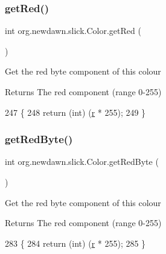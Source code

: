 \subsubsection{\texorpdfstring{get\+Red()}{getRed()}}
{\footnotesize\ttfamily int org.\+newdawn.\+slick.\+Color.\+get\+Red (\begin{DoxyParamCaption}{ }\end{DoxyParamCaption})\hspace{0.3cm}{\ttfamily [inline]}}

Get the red byte component of this colour

\begin{DoxyReturn}{Returns}
The red component (range 0-\/255) 
\end{DoxyReturn}

\begin{DoxyCode}
247                         \{
248         \textcolor{keywordflow}{return} (\textcolor{keywordtype}{int}) (\mbox{\hyperlink{classorg_1_1newdawn_1_1slick_1_1_color_ac07fa95108064b044dcf9a53e95dcb48}{r}} * 255);
249     \}
\end{DoxyCode}
\mbox{\label{classorg_1_1newdawn_1_1slick_1_1_color_a58a2471bc87556182c276c4d2ab24b36}} 
\subsubsection{\texorpdfstring{get\+Red\+Byte()}{getRedByte()}}
{\footnotesize\ttfamily int org.\+newdawn.\+slick.\+Color.\+get\+Red\+Byte (\begin{DoxyParamCaption}{ }\end{DoxyParamCaption})\hspace{0.3cm}{\ttfamily [inline]}}

Get the red byte component of this colour

\begin{DoxyReturn}{Returns}
The red component (range 0-\/255) 
\end{DoxyReturn}

\begin{DoxyCode}
283                             \{
284         \textcolor{keywordflow}{return} (\textcolor{keywordtype}{int}) (\mbox{\hyperlink{classorg_1_1newdawn_1_1slick_1_1_color_ac07fa95108064b044dcf9a53e95dcb48}{r}} * 255);
285     \}
\end{DoxyCode}
\mbox{\label{classorg_1_1newdawn_1_1slick_1_1_color_a5e500cb43fc36af2e9ad8030b6766240}} 
